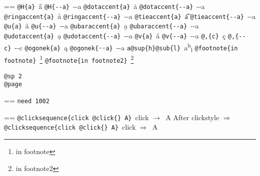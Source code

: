 \documentclass{book}
\makeatletter
\newenvironment{GNUTexinfopreformatted}{%
  \par\GNUTobeylines\obeyspaces\frenchspacing
  \parskip=\z@\parindent=\z@}{}
{\catcode`\^^M=13 \gdef\GNUTobeylines{\catcode`\^^M=13 \def^^M{\null\par}}}
\newenvironment{GNUTexinfoindented}
  {\begin{list}{}{}
  \item\relax}
  {\end{list}}
\makeatother
\begin{document}
\begin{GNUTexinfoindented}
\begin{GNUTexinfopreformatted}
\texttt{@H\{a\}}\ \H{a}
\texttt{@H\{{-}{-}a\}}\ \H{{-}{-}a}
\texttt{@dotaccent\{a\}}\ \.{a}
\texttt{@dotaccent\{{-}{-}a\}}\ \.{{-}{-}a}
\texttt{@ringaccent\{a\}}\ \r{a}
\texttt{@ringaccent\{{-}{-}a\}}\ \r{{-}{-}a}
\texttt{@tieaccent\{a\}}\ \t{a}
\texttt{@tieaccent\{{-}{-}a\}}\ \t{{-}{-}a}
\texttt{@u\{a\}}\ \u{a}
\texttt{@u\{{-}{-}a\}}\ \u{{-}{-}a}
\texttt{@ubaraccent\{a\}}\ \b{a}
\texttt{@ubaraccent\{{-}{-}a\}}\ \b{{-}{-}a}
\texttt{@udotaccent\{a\}}\ \d{a}
\texttt{@udotaccent\{{-}{-}a\}}\ \d{{-}{-}a}
\texttt{@v\{a\}}\ \v{a}
\texttt{@v\{{-}{-}a\}}\ \v{{-}{-}a}
\texttt{@,\{c\}}\ \c{c}
\texttt{@,\{{-}{-}c\}}\ \c{{-}{-}c}
\texttt{@ogonek\{a\}}\ \k{a}
\texttt{@ogonek\{{-}{-}a\}}\ \k{{-}{-}a}
\texttt{a@sup\{h\}@sub\{l\}}\ a\textsuperscript{h}\textsubscript{l}
\texttt{@footnote\{in footnote\}}\ \footnote{in footnote}
\texttt{@footnote\{in footnote2\}}\ \footnote{in footnote2}

\texttt{@sp 2}\leavevmode{}\\
\baselineskip %
\texttt{@page}\leavevmode{}\\
\end{GNUTexinfopreformatted}
\newpage{}%
\phantom{blabla}%
\begin{GNUTexinfopreformatted}%
\ttfamily 
\texttt{need 1002}
\end{GNUTexinfopreformatted}
\needspace{1.002pt}%
\begin{GNUTexinfopreformatted}%
\ttfamily 
\texttt{@clicksequence\{click @click\{\}\ A\}}\ click $\rightarrow{}$\ A
After clickstyle $\Rightarrow{}$
\texttt{@clicksequence\{click @click\{\}\ A\}}\ click $\Rightarrow{}$\ A



\end{GNUTexinfopreformatted}
\end{GNUTexinfoindented}
\end{document}
